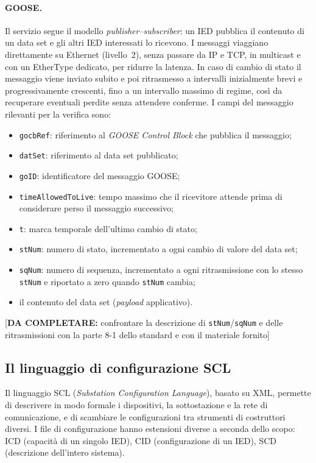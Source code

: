 \documentclass[11pt,a4paper,italian,oneside,openany]{book}
\newcommand{\daf}[1]{{\color{red}[\textbf{DA COMPLETARE:} #1]}}
\begin{document}
\paragraph{GOOSE.} Il servizio segue il modello \textit{publisher--subscriber}: un IED pubblica il contenuto di un data set e gli altri IED interessati lo ricevono. I messaggi viaggiano direttamente su Ethernet (livello~2), senza passare da IP e TCP, in multicast e con un EtherType dedicato, per ridurre la latenza. In caso di cambio di stato il messaggio viene inviato subito e poi ritrasmesso a intervalli inizialmente brevi e progressivamente crescenti, fino a un intervallo massimo di regime, così da recuperare eventuali perdite senza attendere conferme. I campi del messaggio rilevanti per la verifica sono:
\begin{itemize}
    \item \texttt{gocbRef}: riferimento al \textit{GOOSE Control Block} che pubblica il messaggio;
    \item \texttt{datSet}: riferimento al data set pubblicato;
    \item \texttt{goID}: identificatore del messaggio GOOSE;
    \item \texttt{timeAllowedToLive}: tempo massimo che il ricevitore attende prima di considerare perso il messaggio successivo;
    \item \texttt{t}: marca temporale dell'ultimo cambio di stato;
    \item \texttt{stNum}: numero di stato, incrementato a ogni cambio di valore del data set;
    \item \texttt{sqNum}: numero di sequenza, incrementato a ogni ritrasmissione con lo stesso \texttt{stNum} e riportato a zero quando \texttt{stNum} cambia;
    \item il contenuto del data set (\textit{payload} applicativo).
\end{itemize}
\daf{confrontare la descrizione di \texttt{stNum}/\texttt{sqNum} e delle ritrasmissioni con la parte 8-1 dello standard e con il materiale fornito}

\subsection{Il linguaggio di configurazione SCL}
Il linguaggio SCL (\textit{Substation Configuration Language}), basato su XML, permette di descrivere in modo formale i dispositivi, la sottostazione e la rete di comunicazione, e di scambiare le configurazioni tra strumenti di costruttori diversi. I file di configurazione hanno estensioni diverse a seconda dello scopo: ICD (capacità di un singolo IED), CID (configurazione di un IED), SCD (descrizione dell'intero sistema).
\end{document}
